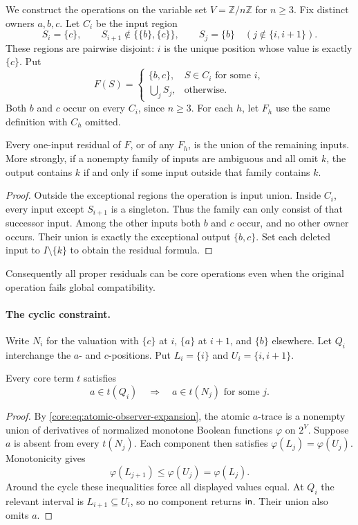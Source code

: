 We construct the operations on the variable set $V=\mathbb Z/n\mathbb Z$
for $n\geq3$. Fix distinct owners $a,b,c$. Let $C_i$ be the input region
\[
 S_i=\{c\},\qquad S_{i+1}\notin\{\{b\},\{c\}\},\qquad
 S_j=\{b\}\quad(j\notin\{i,i+1\}).
\]
These regions are pairwise disjoint: $i$ is the unique position whose
value is exactly $\{c\}$. Put
\[
 F(S)=\begin{cases}
 \{b,c\},&S\in C_i\text{ for some }i,\\
 \displaystyle\bigcup_j S_j,&\text{otherwise}.
 \end{cases}
\]
Both $b$ and $c$ occur on every $C_i$, since $n\geq3$.
For each $h$, let $F_h$ use the same definition with $C_h$ omitted.

\begin{corollary}\label{core:cor:crown-residuals}
Every one-input residual of $F$, or of any $F_h$, is the union of the
remaining inputs. More strongly, if a nonempty family of inputs are
ambiguous and all omit $k$, the output contains $k$ if and only if some
input outside that family contains $k$.
\end{corollary}
\begin{proof}
Outside the exceptional regions the operation is input union. Inside
$C_i$, every input except $S_{i+1}$ is a singleton. Thus the family can
only consist of that successor input. Among the other inputs both $b$
and $c$ occur, and no other owner occurs. Their union is exactly the
exceptional output $\{b,c\}$. Set each deleted input to
$I\setminus\{k\}$ to obtain the residual formula.
\end{proof}

Consequently all proper residuals can be core operations even when the
original operation fails global compatibility.

\paragraph{The cyclic constraint.}
Write $N_i$ for the valuation with $\{c\}$ at $i$, $\{a\}$ at
$i+1$, and $\{b\}$ elsewhere. Let $Q_i$ interchange the $a$- and
$c$-positions. Put $L_i=\{i\}$ and $U_i=\{i,i+1\}$.

\begin{lemma}\label{core:lem:cyclic-persistence}
Every core term $t$ satisfies
\[
 a\in t(Q_i)\quad\Longrightarrow\quad
 a\in t(N_j)\text{ for some }j.
\]
\end{lemma}
\begin{proof}
By \eqref{core:eq:atomic-observer-expansion}, the atomic $a$-trace is a
nonempty union of derivatives of normalized monotone Boolean functions
$\varphi$ on $2^V$.
Suppose $a$ is absent from every $t(N_j)$. Each component then satisfies
$\varphi(L_j)=\varphi(U_j)$. Monotonicity gives
\[
 \varphi(L_{j+1})\leq\varphi(U_j)=\varphi(L_j).
\]
Around the cycle these inequalities force all displayed values equal.
At $Q_i$ the relevant interval is $L_{i+1}\subseteq U_i$, so no
component returns $\mathsf{in}$. Their union also omits $a$.
\end{proof}

